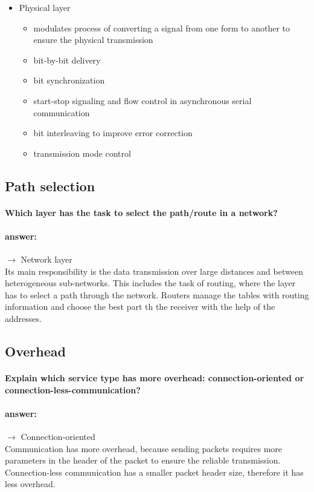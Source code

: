 \documentclass[a4paper,12pt]{article}
\begin{document}
\begin{itemize}
	\item Physical layer
	\begin{itemize}
		\item  modulates process of converting a signal from one form to another to ensure the physical transmission
		\item  bit-by-bit delivery
		\item  bit synchronization
		\item  start-stop signaling and flow control in asynchronous serial communication
		\item  bit interleaving to improve error correction
		\item  transmission mode control
	\end{itemize}

\end{itemize}
 
 \subsection{Path selection}
 \paragraph{Which layer has the task to select the path/route in a network?}
 \paragraph{answer:} 
 $\rightarrow$ Network layer \\
 Its main responsibility is the data transmission over large distances and between heterogeneous sub-networks. This includes the task of routing, where the layer has to select a path through the network. Routers manage the tables with routing information and choose the best part th the receiver with the help of the addresses. 
 
 \subsection{Overhead}
 \paragraph{Explain which service type has more overhead: connection-oriented or connection-less-communication?} 
 \paragraph{answer:} 
 $\rightarrow$ Connection-oriented\\
 Communication has more overhead, because sending packets requires more parameters in the header of the packet to ensure the reliable transmission. Connection-less communication has a smaller packet header size, therefore it has less overhead. 
 
\end{document}
